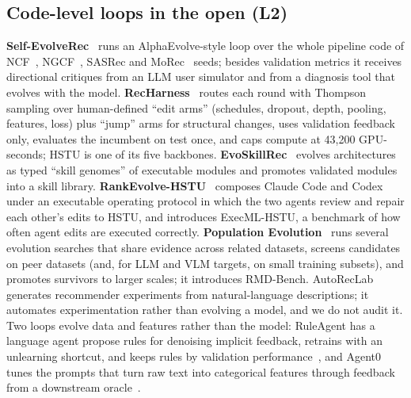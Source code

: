 \documentclass[sigconf,nonacm]{acmart}
\begin{document}
\subsection{Code-level loops in the open (L2)}
\textbf{Self-EvolveRec}~\cite{kim2026selfevolverec} runs an AlphaEvolve-style loop over the whole pipeline code of
NCF~\cite{he2017ncf}, NGCF~\cite{wang2019ngcf}, SASRec and MoRec~\cite{yuan2023morec} seeds; besides validation metrics it receives directional critiques from an LLM user
simulator and from a diagnosis tool that evolves with the model. \textbf{RecHarness}~\cite{ling2026recharness} routes
each round with Thompson sampling over human-defined ``edit arms'' (schedules, dropout, depth, pooling, features,
loss) plus ``jump'' arms for structural changes, uses validation feedback only, evaluates the incumbent on test once,
and caps compute at 43{,}200 GPU-seconds; HSTU is one of its five backbones. \textbf{EvoSkillRec}~\cite{li2026evoskillrec}
evolves architectures as typed ``skill genomes'' of executable modules and promotes validated modules into a skill
library. \textbf{RankEvolve-HSTU}~\cite{chen2026rankevolve} composes Claude Code and Codex under an executable operating
protocol in which the two agents review and repair each other's edits to HSTU, and introduces ExecML-HSTU, a benchmark
of how often agent edits are executed correctly. \textbf{Population Evolution}~\cite{peng2026population} runs several
evolution searches that share evidence across related datasets, screens candidates on peer datasets (and, for LLM and VLM targets, on small training subsets), and promotes
survivors to larger scales; it introduces RMD-Bench. AutoRecLab~\cite{baumgart2026autoreclab,beel2025autoreclab}
generates recommender experiments from natural-language descriptions; it automates experimentation rather than
evolving a model, and we do not audit it. Two loops evolve data and features rather than the model: RuleAgent has a
language agent propose rules for denoising implicit feedback, retrains with an unlearning shortcut, and keeps rules by
validation performance~\cite{wang2025ruleagent}, and Agent0 tunes the prompts that turn raw text into categorical
features through feedback from a downstream oracle~\cite{skrlj2025agent0}.
\end{document}

